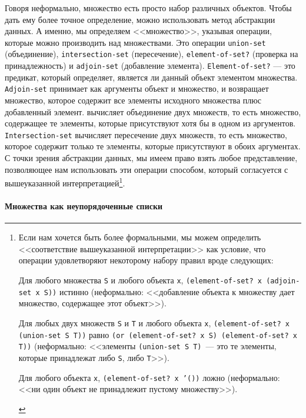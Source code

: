 Говоря неформально, множество есть просто набор различных
объектов.  Чтобы дать ему более точное определение, можно использовать 
метод абстракции данных.  А именно, мы определяем <<множество>>, указывая
операции, которые можно производить над
множествами.  Это операции {\tt union-set} (объединение),
{\tt intersection-set} (пересечение),
{\tt element-of-set?} (проверка на принадлежность) и
{\tt adjoin-set} (добавление элемента).
{\tt Element-of-set?}
--- это предикат, который определяет,
является ли данный объект элементом множества. {\tt Adjoin-set}
принимает как аргументы объект и множество, и возвращает множество,
которое содержит все элементы исходного множества плюс добавленный
элемент.  вычисляет объединение двух множеств,
то есть множество, содержащее те элементы, которые присутствуют хотя
бы в одном из аргументов.  {\tt Intersection-set} вычисляет
пересечение двух множеств, то есть множество, которое содержит только 
те элементы, которые присутствуют в обоих аргументах.  С точки зрения
абстракции данных, мы имеем право взять любое
представление, позволяющее нам использовать эти операции способом, который
согласуется с вышеуказанной интерпретацией\footnote{\samepage%
Если нам хочется быть более формальными, мы можем
определить <<соответствие вышеуказанной интерпретации>> как условие,
что операции удовлетворяют некоторому набору правил вроде
следующих:

\begin{plainlist}
\item
Для любого множества {\tt S} и любого
объекта {\tt x}, {\tt (element-of-set? x (adjoin-set x
S))} истинно (неформально: <<добавление объекта к множеству дает 
множество, содержащее этот объект>>).

\item
Для любых двух множеств {\tt S} и
{\tt T} и любого объекта {\tt x}, {\tt (element-of-set?
x (union-set S T))} равно {\tt (or (element-of-set? x S)
(element-of-set? x T))} (неформально: <<элементы {\tt (union-set S
T)}~--- это те элементы, которые принадлежат либо
{\tt S}, либо {\tt T}>>).

\item
Для любого объекта {\tt x},
{\tt (element-of-set? x '())} ложно (неформально: <<ни один 
объект не принадлежит пустому множеству>>).
\end{plainlist}}.

\paragraph{Множества как неупорядоченные списки }


